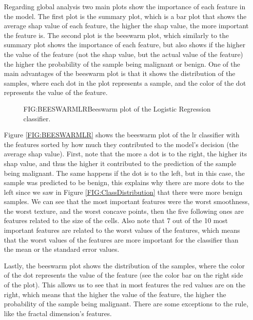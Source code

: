 Regarding global analysis two main plots show the importance of each feature in the model. The first plot is the summary plot, which is a bar plot that shows the average \ac{shap} value of each feature, the higher the \ac{shap} value, the more important the feature is. The second plot is the beeswarm plot, which similarly to the summary plot shows the importance of each feature, but also shows if the higher the value of the feature (not the \ac{shap} value, but the actual value of the feature) the higher the probability of the sample being malignant or benign. One of the main advantages of the beeswarm plot is that it shows the distribution of the samples, where each dot in the plot represents a sample, and the color of the dot represents the value of the feature.

\begin{figure}[Beeswarm Plot of Logistic Regression]{FIG:BEESWARMLR}{Beeswarm plot of the Logistic Regression classifier.}
\end{figure}

Figure \ref{FIG:BEESWARMLR} shows the beeswarm plot of the \ac{lr} classifier with the features sorted by how much they contributed to the model's decision (the average \ac{shap} value). First, note that the more a dot is to the right, the higher its \ac{shap} value, and thus the higher it contributed to the prediction of the sample being malignant. The same happens if the dot is to the left, but in this case, the sample was predicted to be benign, this explains why there are more dots to the left since we saw in Figure \ref{FIG:ClassDistribution} that there were more benign samples. We can see that the most important features were the worst smoothness, the worst texture, and the worst concave points, then the five following ones are features related to the size of the cells. Also note that 7 out of the 10 most important features are related to the worst values of the features, which means that the worst values of the features are more important for the classifier than the mean or the standard error values.

Lastly, the beeswarm plot shows the distribution of the samples, where the color of the dot represents the value of the feature (see the color bar on the right side of the plot). This allows us to see that in most features the red values are on the right, which means that the higher the value of the feature, the higher the probability of the sample being malignant. There are some exceptions to the rule, like the fractal dimension's features.

